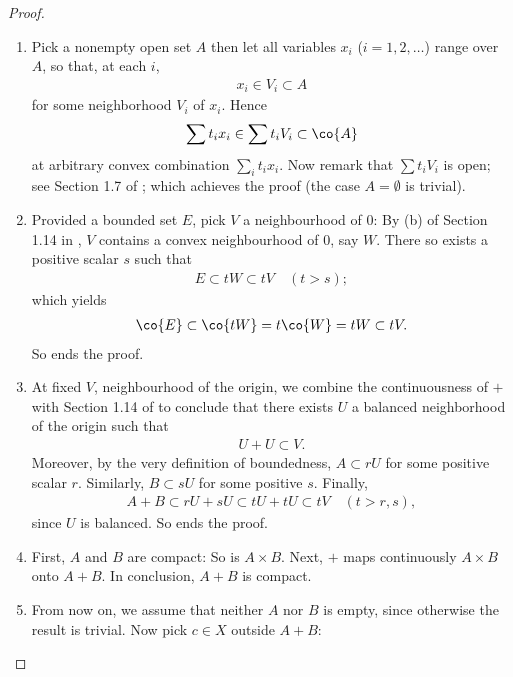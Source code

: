 \begin{proof}
\renewcommand{\labelenumi}{(\alph{enumi})} 
\begin{enumerate}
\item 
Pick a nonempty open set $A$ then let all variables %
$\mathit{x_i}$ ($i=1, 2, \dots$) range over $A$, %
so that, at each $i$,  %
%
\begin{align}
  x_i \in V_i \subset A 
\end{align}
%
for some neighborhood $V_i$ of $x_i$. %
%
Hence 
%
\begin{align}
  \sum t_i x_i \in \sum t_i V_i  \subset \co{A}
\end{align}
%
at arbitrary convex combination $\sum_i t_i x_i$. %
Now remark that $\sum t_i V_i$ is open; see Section 1.7 of \cite{FA}; %
which achieves the proof (the case $A=\emptyset$ is trivial). %
%
\item Provided a bounded set $E$, %
pick $V$ a neighbourhood of $0$: By (b) of Section 1.14 in \cite{FA}, %
$V$ contains a convex neighbourhood of $0$, say $W$. %
%
There so exists a positive scalar $s$ such that
%
\begin{align}
  E \subset tW \subset tV \quad (t>s); 
\end{align}
%
which yields %
%
\begin{align}
  \co{E} \subset \co{tW} = t\co{W} = t W \subset tV.
\end{align}
%
So ends the proof. %
%
\item At fixed $V$, neighbourhood of the origin, %
we combine the continuousness of $+$ with Section 1.14 of \cite{FA} %
to conclude that there exists $U$ a balanced neighborhood of the origin %
such that %
%
\begin{align}
  U+U\subset V. 
\end{align}
%
Moreover, by the very definition of boundedness, %
$A \subset r U$ for some positive scalar $r$. %
Similarly, $B \subset s U$ for some positive $s$. %
%
Finally, 
%
\begin{align}
A+B \subset  rU + sU \subset tU + tU \subset tV \quad (t > r, s), 
\end{align}
%
since $U$ is balanced. So ends the proof. %
%
\item First, $A$ and $B$ are compact: So is $A\times B$. %
Next, $+$ maps continuously $A\times B$ onto $A+B$. %
In conclusion, $A+B$ is compact. %
%
\item From now on, we assume that neither $A$ nor $B$ is empty, %
since otherwise the result is trivial.  %
Now pick $c\in X$ outside $A+B$: %

\end{enumerate}
\end{proof}
